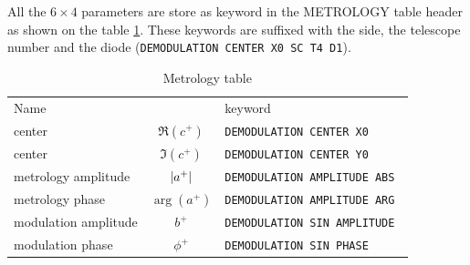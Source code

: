 \documentclass[a4paper,11pt,twoside]{scrartcl}
\begin{document}
All the $6\times4$ parameters are store as keyword in the METROLOGY table header as shown on the table \ref{tab:keyword}. These keywords are suffixed with the side, the telescope number and the diode (\eg \verb|DEMODULATION CENTER X0 SC T4 D1|).
\begin{table}[]
    \centering
    \begin{tabular}{l c l}
Name   &          & keyword   \\
center    &      $\Re(c^+)$        &   \verb|DEMODULATION CENTER X0|   \\
center   &      $\Im(c^+) $       &   \verb|DEMODULATION CENTER Y0|   \\
metrology amplitude  &      $\left\vert a^+\right\vert $       &   \verb|DEMODULATION AMPLITUDE ABS|   \\
metrology phase  &      $\arg{(a^+)} $       &   \verb|DEMODULATION AMPLITUDE ARG|   \\
modulation amplitude  &      $b^+ $       &   \verb|DEMODULATION SIN AMPLITUDE |   \\
modulation phase  &      $\phi^+ $       &   \verb|DEMODULATION SIN PHASE|   
    \end{tabular}
    \caption{Metrology table}
    \label{tab:keyword}
\end{table}
\end{document}

